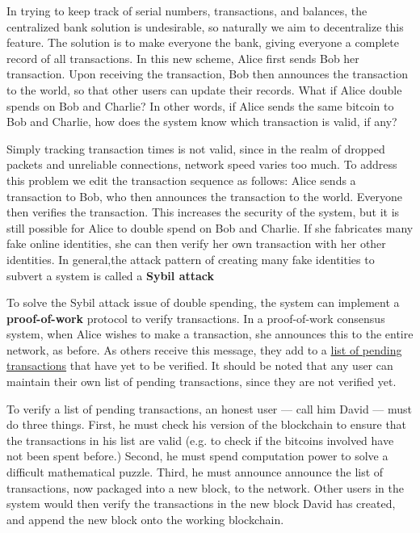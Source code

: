\documentclass[11pt]{article}
\begin{document}
    In trying to keep track of serial numbers, transactions, and balances, the centralized bank solution is undesirable, so naturally we aim to decentralize this feature. The solution is to make everyone the bank, giving everyone a complete record of all transactions. In this new scheme, Alice first sends Bob her transaction. Upon receiving the transaction, Bob then announces the transaction to the world, so that other users can update their records. What if Alice double spends on Bob and Charlie? In other words, if Alice sends the same bitcoin to Bob and Charlie, how does the system know which transaction is valid, if any? 
    
    Simply tracking transaction times is not valid, since in the realm of dropped packets and unreliable connections, network speed varies too much. To address this problem we edit the transaction sequence as follows: Alice sends a transaction to Bob, who then announces the transaction to the world. Everyone then verifies the transaction. This increases the security of the system, but it is still possible for Alice to double spend on Bob and Charlie. If she fabricates many fake online identities, she can then verify her own transaction with her other identities. In general,the attack pattern of creating many fake identities to subvert a system is called a \textbf{Sybil attack}
    
    To solve the Sybil attack issue of double spending, the system can implement a \textbf{proof-of-work} protocol to verify transactions. In a proof-of-work consensus system, when Alice wishes to make a transaction, she announces this to the entire network, as before. As others receive this message, they add to a \underline{list of pending transactions} that have yet to be verified. It should be noted that any user can maintain their own list of pending transactions, since they are not verified yet.
    
    To verify a list of pending transactions, an honest user --- call him David --- must do three things. First, he must check his version of the blockchain to ensure that the transactions in his list are valid (e.g. to check if the bitcoins involved have not been spent before.) Second, he must spend computation power to solve a difficult mathematical puzzle. Third, he must announce announce the list of transactions, now packaged into a new block, to the network. Other users in the system would then verify the transactions in the new block David has created, and append the new block onto the working blockchain.
    
\end{document}
